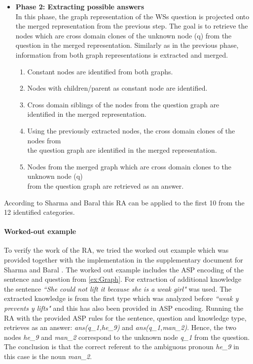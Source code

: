 \begin{itemize}
	\item \textbf{Phase 2: Extracting possible answers}\\
	In this phase, the graph representation of the WSs question is projected onto the merged representation from the previous step. The goal is to retrieve the nodes which are cross domain clones of the unknown node (q) from the question in the merged representation. Similarly as in the previous phase, information from both graph representations is extracted and merged.
	\begin{enumerate}
		\item Constant nodes are identified from both graphs.
		\item Nodes with children/parent as constant node are identified. 
		\item Cross domain siblings of the nodes from the question graph are \\ identified in the merged representation.
		\item Using the previously extracted nodes, the cross domain clones of the nodes from\\ the question graph are identified in the merged representation.
		\item Nodes from the merged graph which are cross domain clones to the unknown node (q)\\ from the question graph are retrieved as an answer.
	\end{enumerate}
\end{itemize}

According to Sharma and Baral \cite{2018CommonsenseKT} this RA can be applied to the first 10 from the  12 identified categories.

\paragraph{Worked-out example} To verify the work of the RA, we tried the worked out example which was provided together with the implementation in the supplementary document for Sharma and Baral \cite{2018CommonsenseKT}. The worked out example includes the ASP encoding of the sentence and question from \ref{ex:Graph}. For extraction of additional knowledge the sentence \textit{``She could not lift it because she is a weak girl"} was used. The extracted knowledge is from the first type which was analyzed before \textit{``weak y prevents y lifts"} and this has also been provided in ASP encoding. Running the RA with the provided ASP rules for the sentence, question and knowledge type, retrieves as an answer: \textit{ans(q\_1,he\_9)} and \textit{ans(q\_1,man\_2)}. Hence, the two nodes \textit{he\_9} and \textit{man\_2} correspond to the unknown node \textit{q\_1} from the question. The conclusion is that the correct referent to the ambiguous pronoun \textit{he\_9} in this case is the noun \textit{man\_2}.

